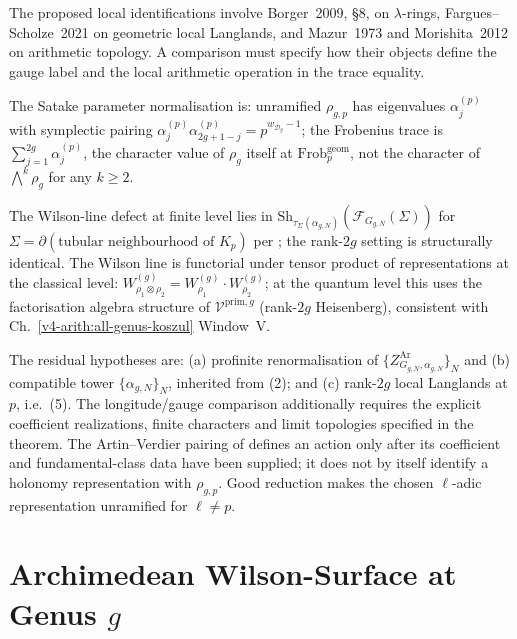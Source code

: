 \begin{remark}
\label{v4-arith:w9-r6:rem:independence-wilson-line}
The proposed local identifications involve Borger~2009, \S8,
on $\lambda$-rings, Fargues--Scholze~2021 on geometric local
Langlands, and Mazur~1973 and Morishita~2012 on arithmetic topology.
A comparison must specify how their objects define the gauge label
and the local arithmetic operation in the trace equality.

The Satake parameter normalisation is: unramified \(\rho_{g,p}\) has eigenvalues
\(\alpha_{j}^{(p)}\) with symplectic pairing
\(\alpha_{j}^{(p)}\alpha_{2g+1-j}^{(p)}=p^{w_{\mathcal{D}_{g}}-1}\); the
Frobenius trace is \(\sum_{j=1}^{2g}\alpha_{j}^{(p)}\), the character value of
\(\rho_{g}\) itself at \(\mathrm{Frob}_{p}^{\mathrm{geom}}\), not the character of
\(\bigwedge^{k}\rho_{g}\) for any \(k\geq 2\).

The Wilson-line defect at finite level lies in
\(\mathrm{Sh}_{\tau_{\Sigma}(\alpha_{g,N})}(\mathcal{F}_{G_{g,N}}(\Sigma))\)
for \(\Sigma=\partial(\text{tubular neighbourhood of }K_{p})\) per
; the rank-\(2g\) setting is
structurally identical. The Wilson line is functorial under tensor product of
representations at the classical level:
\(W^{(g)}_{\rho_{1}\otimes\rho_{2}}=W^{(g)}_{\rho_{1}}\cdot W^{(g)}_{\rho_{2}}\);
at the quantum level this uses the factorisation algebra structure of
\(\mathcal{V}^{\mathrm{prim},g}\) (rank-\(2g\) Heisenberg), consistent with
Ch.~\ref{v4-arith:all-genus-koszul} Window~V.

The residual hypotheses are: (a) profinite renormalisation of
\(\{Z^{\mathrm{Ar}}_{G_{g,N},\alpha_{g,N}}\}_{N}\) and (b) compatible tower
\(\{\alpha_{g,N}\}_{N}\), inherited from (2); and
(c) rank-\(2g\) local Langlands at \(p\), i.e.\ (5).
The longitude/gauge comparison additionally requires the explicit
coefficient realizations, finite characters and limit topologies specified
in the theorem. The Artin--Verdier pairing of
 defines an action
only after its coefficient and fundamental-class data have been supplied;
it does not by itself identify a holonomy representation with $\rho_{g,p}$.
Good reduction makes the chosen $\ell$-adic representation unramified
for $\ell\ne p$.
\end{remark}

\section{Archimedean Wilson-Surface at Genus \(g\)}
\label{v4-arith:w9-r6:wilson-surface-g}

